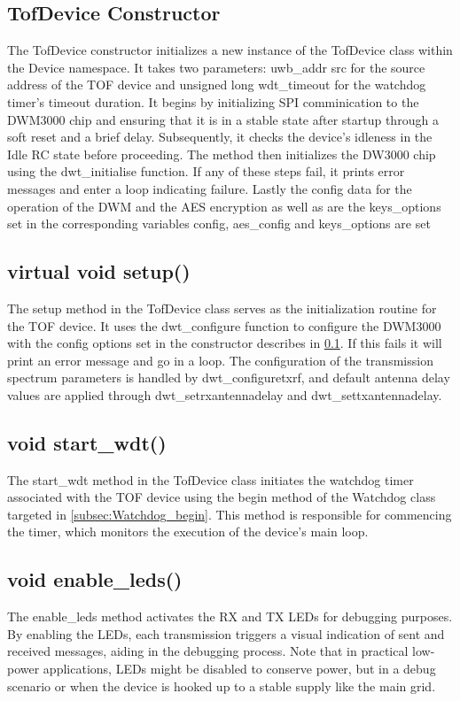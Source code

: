 \subsection{TofDevice Constructor}
\label{subsec:TofDevice_Constructor}
The TofDevice constructor initializes a new instance of the TofDevice class within the Device namespace. It takes two parameters: uwb\_addr src for the source address of the TOF device and unsigned long wdt\_timeout for the watchdog timer's timeout duration. 
It begins by initializing SPI comminication to the DWM3000 chip and ensuring that it is in a stable state after startup through a soft reset and a brief delay. 
Subsequently, it checks the device's idleness in the Idle RC state before proceeding. 
The method then initializes the DW3000 chip using the dwt\_initialise function. 
If any of these steps fail, it prints error messages and enter a loop indicating failure. 
Lastly the config data for the operation of the DWM and the AES encryption as well as are the keys\_options set in the corresponding variables config, aes\_config and keys\_options are set

\subsection{virtual void setup()}
\label{subsec:TofDevice_setup}
The setup method in the TofDevice class serves as the initialization routine for the TOF device. 
It uses the dwt\_configure function to configure the DWM3000 with the config options set in the constructor describes in \ref{subsec:TofDevice_Constructor}. 
If this fails it will print an error message and go in a loop. 
The configuration of the transmission spectrum parameters is handled by dwt\_configuretxrf, and default antenna delay values are applied through dwt\_setrxantennadelay and dwt\_settxantennadelay. 

\subsection{void start\_wdt()}
\label{subsec:TofDevice_start_wdt}
The start\_wdt method in the TofDevice class initiates the watchdog timer associated with the TOF device using the begin method of the Watchdog class targeted in \ref{subsec:Watchdog_begin}. This method is responsible for commencing the timer, which monitors the execution of the device's main loop. 

\subsection{void enable\_leds()}
\label{subsec:TofDevice_enable_leds}
The enable\_leds method activates the RX and TX LEDs for debugging purposes. 
By enabling the LEDs, each transmission triggers a visual indication of sent and received messages, aiding in the debugging process. Note that in practical low-power applications, LEDs might be disabled to conserve power, but in a debug scenario or when the device is hooked up to a stable supply like the main grid. 

